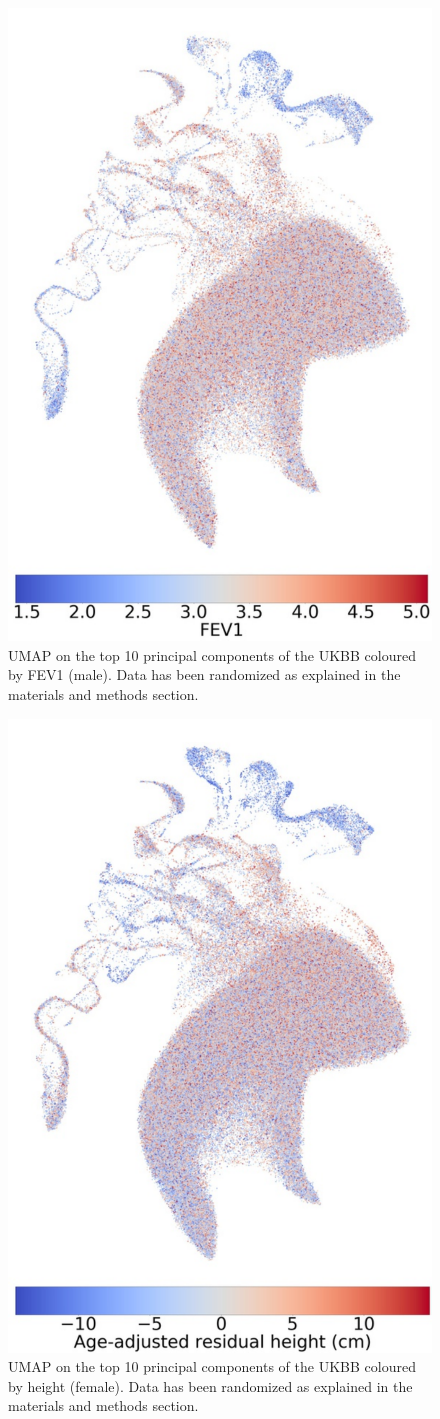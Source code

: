 \documentclass[12pt]{pnas-new}
\begin{document}
\begin{figure}
    \centering
    \includegraphics[width=0.4\columnwidth]{images/UKBB_UMAP_PC10_NN15_MD05_2018328174511_201871416305_3063_0_0_pct1_m.pdf}
    \caption{UMAP on the top 10 principal components of the UKBB coloured by FEV1 (male). Data has been randomized as explained in the materials and methods section.}
    \label{fig:supp_ukbb_fev_m}
\end{figure}

\begin{figure}
    \centering
    \includegraphics[width=0.4\columnwidth]{images/UKBB_UMAP_PC10_NN15_MD05_2018328174511_2018714161841_Height_res_pct1_f.pdf}
    \caption{UMAP on the top 10 principal components of the UKBB coloured by height (female). Data has been randomized as explained in the materials and methods section.}
    \label{fig:supp_ukbb_height_f}
\end{figure}
\end{document}
